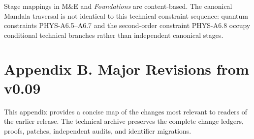 \documentclass[
  11pt,
]{article}
\begin{document}
Stage mappings in M\&E and \emph{Foundations} are content-based. The
canonical Mandala traversal is not identical to this technical
constraint sequence: quantum constraints PHYS-A6.5--A6.7 and the
second-order constraint PHYS-A6.8 occupy conditional technical branches
rather than independent canonical stages.

\section{Appendix B. Major Revisions from
v0.09}\label{appendix-b.-major-revisions-from-v0.09}

This appendix provides a concise map of the changes most relevant to
readers of the earlier release. The technical archive preserves the
complete change ledgers, proofs, patches, independent audits, and
identifier migrations.
\end{document}
